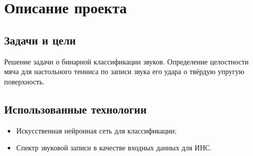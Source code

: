 \section{Описание проекта}
\subsection{Задачи и цели}
	Решение задачи о бинарной классификации звуков.
	Определение целостности мяча для настольного тенниса по записи звука его удара о твёрдую упругую поверхность.

\subsection{Использованные технологии}
	\begin{itemize}
		\item Искусственная нейронная сеть для классификации;
		\item Спектр звуковой записи в качестве входных данных для ИНС.
	\end{itemize}